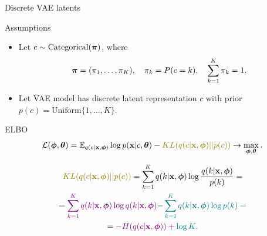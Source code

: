 \begin{frame}{Discrete VAE latents}
	\begin{block}{Assumptions}
		\begin{itemize}
			\item Let $c \sim \text{Categorical}(\boldsymbol{\pi})$, where 
			\vspace{-0.6cm}
			\[
			\boldsymbol{\pi} = (\pi_1, \dots, \pi_K), \quad \pi_k = P(c = k), \quad \sum_{k=1}^K \pi_k = 1.
			\]
			\vspace{-0.6cm}
			\item Let VAE model has discrete latent representation $c$ with prior $p(c) = \text{Uniform}\{1, \dots, K\}$.
		\end{itemize}
	\end{block}
	\begin{block}{ELBO}
		\vspace{-0.5cm}
		\[
			\mathcal{L} (\bphi, \btheta)  = \mathbb{E}_{q(c | \bx, \bphi)} \log p(\bx | c, \btheta) - {\color{olive} KL(q(c| \bx, \bphi) || p(c))} \rightarrow \max_{\bphi, \btheta}.
		\]
	\end{block}
	\vspace{-1.0cm}
	{\small
	\begin{multline*}
		{\color{olive} KL(q(c| \bx, \bphi) || p(c))} = \sum_{k=1}^K q(k | \bx, \bphi) \log \frac{q(k | \bx, \bphi)}{p(k)} = 
		\\ = \color{violet}{\sum_{k=1}^K q(k | \bx, \bphi) \log q(k | \bx, \bphi)}  \color{teal}{- \sum_{k=1}^K q(k | \bx, \bphi) \log p(k)}  = \\ = \color{violet}{- H(q(c | \bx, \bphi))} + \color{teal}{\log K}. 
	\end{multline*}
	}
\end{frame}
